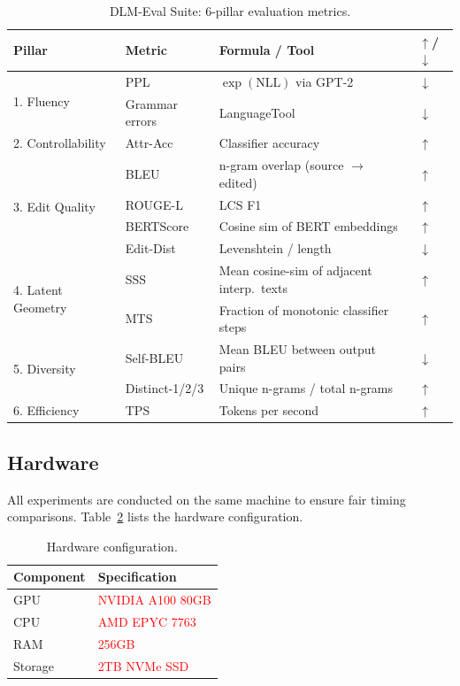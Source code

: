\documentclass{article}
\newcommand{\tbd}[1]{\textcolor{red}{#1}}  %
\begin{document}
\begin{table}[h]
\centering
\caption{DLM-Eval Suite: 6-pillar evaluation metrics.}
\label{tab:metrics}
\begin{tabular}{llll}
\toprule
\textbf{Pillar} & \textbf{Metric} & \textbf{Formula / Tool} & \textbf{$\uparrow$/$\downarrow$} \\
\midrule
\multirow{2}{*}{1. Fluency} & PPL & $\exp(\text{NLL})$ via GPT-2 & $\downarrow$ \\
& Grammar errors & LanguageTool & $\downarrow$ \\
\midrule
2. Controllability & Attr-Acc & Classifier accuracy & $\uparrow$ \\
\midrule
\multirow{4}{*}{3. Edit Quality} & BLEU & n-gram overlap (source $\to$ edited) & $\uparrow$ \\
& ROUGE-L & LCS F1 & $\uparrow$ \\
& BERTScore & Cosine sim of BERT embeddings & $\uparrow$ \\
& Edit-Dist & Levenshtein / length & $\downarrow$ \\
\midrule
\multirow{2}{*}{4. Latent Geometry} & SSS & Mean cosine-sim of adjacent interp.\ texts & $\uparrow$ \\
& MTS & Fraction of monotonic classifier steps & $\uparrow$ \\
\midrule
\multirow{2}{*}{5. Diversity} & Self-BLEU & Mean BLEU between output pairs & $\downarrow$ \\
& Distinct-1/2/3 & Unique n-grams / total n-grams & $\uparrow$ \\
\midrule
6. Efficiency & TPS & Tokens per second & $\uparrow$ \\
\bottomrule
\end{tabular}
\end{table}

\subsection{Hardware}
\label{sec:hardware}

All experiments are conducted on the same machine to ensure fair timing comparisons. Table~\ref{tab:hardware} lists the hardware configuration.

\begin{table}[h]
\centering
\caption{Hardware configuration.}
\label{tab:hardware}
\begin{tabular}{ll}
\toprule
\textbf{Component} & \textbf{Specification} \\
\midrule
GPU & \tbd{NVIDIA A100 80GB} \\
CPU & \tbd{AMD EPYC 7763} \\
RAM & \tbd{256GB} \\
Storage & \tbd{2TB NVMe SSD} \\
\bottomrule
\end{tabular}
\end{table}
\end{document}
